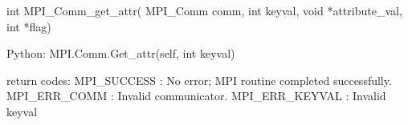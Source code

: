 int MPI_Comm_get_attr(
    MPI_Comm comm, int keyval, void *attribute_val, int *flag)

Python:
MPI.Comm.Get_attr(self, int keyval)

return codes:
MPI_SUCCESS : No error; MPI routine completed successfully. 
MPI_ERR_COMM : Invalid communicator.
MPI_ERR_KEYVAL : Invalid keyval
